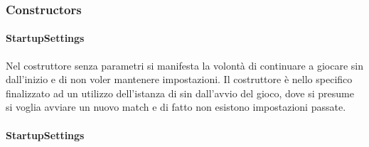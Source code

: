 \documentclass[letterpaper,10pt,italian,openany,oneside]{sphinxmanual}
\begin{document}
\subsubsection{Constructors}
\label{\detokenize{source/it/unicam/cs/pa/mastermind/gamecore/StartupSettings:constructors}}

\paragraph{StartupSettings}
\label{\detokenize{source/it/unicam/cs/pa/mastermind/gamecore/StartupSettings:id1}}

\begin{fulllineitems}
\label{\detokenize{source/it/unicam/cs/pa/mastermind/gamecore/StartupSettings:it.unicam.cs.pa.mastermind.gamecore.StartupSettings.StartupSettings()}}
Nel costruttore senza parametri si manifesta la volontà di continuare a giocare sin dall’inizio e di non voler mantenere impostazioni. Il costruttore è nello specifico finalizzato ad un utilizzo dell’istanza di  sin dall’avvio del gioco, dove si presume si voglia avviare un nuovo match e di fatto non esistono impostazioni passate.

\end{fulllineitems}



\paragraph{StartupSettings}
\label{\detokenize{source/it/unicam/cs/pa/mastermind/gamecore/StartupSettings:id2}}
\end{document}
